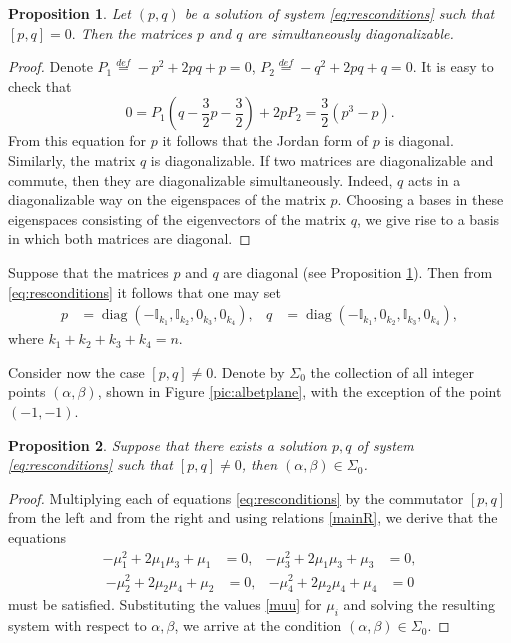 \documentclass{article}
\theoremstyle{plain}
\newtheorem{proposition}{Proposition}
\DeclareMathOperator{\diag}{diag}
\begin{document}
\begin{proposition}\label{prop2}  Let $(p,q)$ be a solution of system \eqref{eq:resconditions} such that  $[p, q]=0.$ Then the matrices $p$ and $q$ are simultaneously diagonalizable.
\end{proposition}
\begin{proof} Denote $P_1\stackrel{def}{=}-p^2+ 2 p q+p=0$, $P_2\stackrel{def}{=}-q^2+ 2 p q+q=0$. It is easy to check that 
\begin{equation*}
0 = P_1 \left(q - \frac{3}{2} p- \frac{3}{2}\right) + 2 p P_2 = \frac{3}{2} \left(p^3-p\right).
\end{equation*}
From this equation for $p$ it follows that the Jordan form of $p$ is diagonal. Similarly, the matrix $q$ is diagonalizable. If two matrices are diagonalizable and commute, then they are diagonalizable simultaneously. Indeed, $q$ acts in a diagonalizable way on the eigenspaces of the matrix $p$. Choosing a bases in these eigenspaces consisting of the eigenvectors of the matrix $q$, we give rise to a basis in which both matrices are diagonal.
\end{proof}

Suppose that the matrices $p$ and $q$ are diagonal  (see Proposition \ref{prop2}). Then from \eqref{eq:resconditions} it follows that one may set 
\begin{align}
    \label{eq:resJNF}
    p
    &= 
    \diag \left(
    - \mathbb{I}_{k_1},
    \mathbb{I}_{k_2},
    0_{k_3},
    0_{k_4}
    \right),
    &
    q
    &= 
    \diag
    \left(
    - \mathbb{I}_{k_1},
    0_{k_2},
    \mathbb{I}_{k_3},
    0_{k_4}
    \right),
\end{align}
where $k_1 + k_2 + k_3 + k_4 = n$. 

Consider now the case $[p,q]\ne 0.$ 
Denote by $\Sigma_0$ the collection of all integer points $(\alpha, \beta)$, shown in Figure \ref{pic:albetplane}, with the exception of the point $(-1,-1)$. 

\begin{proposition}\label{prop1} Suppose that there exists a solution $p,q$ of system \eqref{eq:resconditions} such that $[p,q]\ne 0$, then  $(\alpha, \beta)\in \Sigma_0$. 
\end{proposition}
\begin{proof} Multiplying each of equations \eqref{eq:resconditions} by the commutator $[p, q]$ from the left  and from the right and using relations \eqref{mainR}, we derive that the equations 
\begin{align*}
    -\mu_1^2+2 \mu_1 \mu_3+\mu_1
    &=0, 
    &
    -\mu_3^2+2 \mu_1 \mu_3+\mu_3
    &=0,
\end{align*} 
\begin{align*}
    -\mu_2^2+2 \mu_2 \mu_4+\mu_2
    &=0, 
    &
    -\mu_4^2+2 \mu_2 \mu_4+\mu_4
    &=0
\end{align*}
must be satisfied. Substituting the values \eqref{muu} for $\mu_i$ and solving the resulting system with respect to $\alpha, \beta$, we arrive at the condition $(\alpha, \beta)\in \Sigma_0$.
\end{proof}
\end{document}
